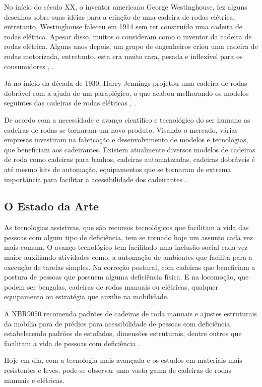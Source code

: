 No início do século XX, o inventor americano George Westinghouse, fez alguns desenhos sobre suas idéias para a criação de uma cadeira de rodas elétrica, entretanto, Westinghouse faleceu em 1914 sem ter construído uma cadeira de rodas elétrica. Apesar disso, muitos o consideram como o inventor da cadeira de rodas elétrica. Alguns anos depois, um grupo de engenheiros criou uma cadeira de rodas motorizada, entretanto, esta era muito cara, pesada e inflexível para os consumidores \cite{clark}, \cite{shepard}.

Já no início da década de 1930, Harry Jennings projetou uma cadeira de rodas dobrável com a ajuda de um paraplégico, o que acabou melhorando os modelos seguintes das cadeiras de rodas elétricas \cite{clark}, \cite{shepard}.

De acordo com a necessidade e avanço cientifico e tecnológico do ser humano as cadeiras de rodas se tornaram um novo produto. Visando o mercado, várias empresas investiram na fabricação e desenvolvimento de modelos e tecnologias, que beneficiam aos cadeirantes. Existem atualmente diversos modelos de cadeiras de roda como cadeiras para banhos, cadeiras automatizadas, cadeiras dobráveis é até mesmo kits de automação, equipamentos que se tornaram de extrema importância para facilitar a acessibilidade dos cadeirantes \cite{ione}.

\subsection{O Estado da Arte}

As tecnologias assistivas, que são recursos tecnológicos que facilitam a vida das pessoas com algum tipo de deficiência, tem se tornado hoje um assunto cada vez mais comum. O avanço tecnológico tem facilitado uma inclusão social cada vez maior auxiliando atividades como, a automação de ambientes que facilita para a execução de tarefas simples. Na correção postural, com cadeiras que beneficiam a postura de pessoas que possuem alguma deficiência física. E na locomoção, que podem ser bengalas, cadeiras de rodas manuais ou elétricas, qualquer equipamento ou estratégia que auxilie na mobilidade.

A NBR9050 recomenda padrões de cadeiras de roda manuais e ajustes estruturais da mobília para de prédios para acessibilidade de pessoas com deficiência, estabelecendo padrões de estofados, dimensões estruturais, dentre outros que facilitam a vida de pessoas com deficiência \cite{becker}.

Hoje em dia, com a tecnologia mais avançada e os estudos em materiais mais resistentes e leves, pode-se observar uma vasta gama de cadeiras de rodas manuais e elétricas.

